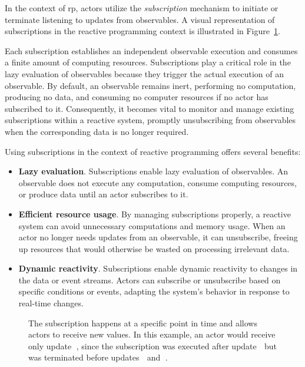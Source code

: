 In the context of \ac{rp}, actors utilize the \textit{subscription} mechanism to
initiate or terminate listening to updates from observables.
A visual representation of subscriptions in the reactive programming context is illustrated in
Figure~\ref{fig:rmp:reactive_subscription}.

Each subscription establishes an independent observable execution and consumes a finite amount
of computing resources.
Subscriptions play a critical role in the lazy evaluation of observables because they trigger
the actual execution of an observable.
By default, an observable remains inert, performing no computation, producing no data, and
consuming no computer resources if no actor has subscribed to it.
Consequently, it becomes vital to monitor and manage existing subscriptions within a reactive
system, promptly unsubscribing from observables when the corresponding data is no longer
required.

Using subscriptions in the context of reactive programming offers several benefits:

\begin{itemize}
  \item \textbf{Lazy evaluation}. 
        Subscriptions enable lazy evaluation of observables.
        An observable does not execute any computation, consume computing resources, or produce data until an actor subscribes to it.
  \item \textbf{Efficient resource usage}.
        By managing subscriptions properly, a reactive system can avoid unnecessary computations and
        memory usage. When an actor no longer needs updates from an observable, it can unsubscribe, freeing up
        resources that would otherwise be wasted on processing irrelevant data.
  \item \textbf{Dynamic reactivity}.
        Subscriptions enable dynamic reactivity to changes in the data or event streams.
        Actors can subscribe or unsubscribe based on specific conditions or events, adapting the
        system's behavior in response to real-time changes.
\end{itemize}

\begin{figure}
  \centering
  \resizebox{\textwidth}{!}{}
  \caption{The subscription happens at a specific point in time and allows actors to receive new values.
    In this example, an actor would receive only update \textcircled{\raisebox{-0.9pt}{2}}, since
    the subscription was executed after update \textcircled{\raisebox{-0.9pt}{1}} but was
    terminated before updates \textcircled{\raisebox{-0.9pt}{3}} and
    \textcircled{\raisebox{-0.9pt}{4}}.
  }
  \label{fig:rmp:reactive_subscription}
\end{figure}


